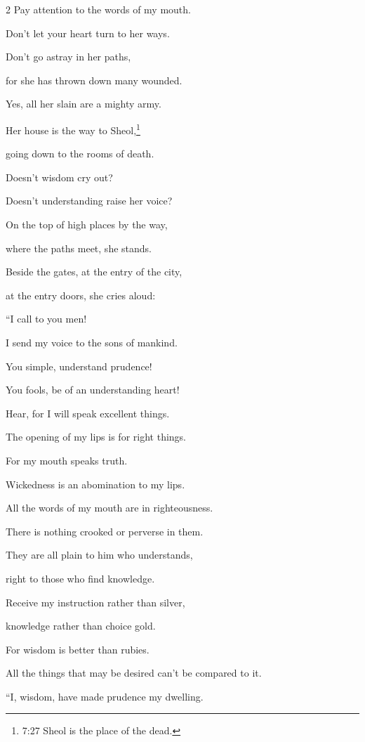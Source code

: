 \begin{multicols}{2}
Pay attention to the words of my mouth.


\myverse{}Don’t let your heart turn to her ways.

Don’t go astray in her paths,


\myverse{}for she has thrown down many wounded.

Yes, all her slain are a mighty army.


\myverse{}Her house is the way to Sheol,\footnote{7:27 Sheol is the place of the dead.
}

going down to the rooms of death.


\mychapter{} \myverse*{}Doesn’t wisdom cry out?

Doesn’t understanding raise her voice?


\myverse{}On the top of high places by the way,

where the paths meet, she stands.


\myverse{}Beside the gates, at the entry of the city,

at the entry doors, she cries aloud:


\myverse{}“I call to you men!

I send my voice to the sons of mankind.


\myverse{}You simple, understand prudence!

You fools, be of an understanding heart!


\myverse{}Hear, for I will speak excellent things.

The opening of my lips is for right things.


\myverse{}For my mouth speaks truth.

Wickedness is an abomination to my lips.


\myverse{}All the words of my mouth are in righteousness.

There is nothing crooked or perverse in them.


\myverse{}They are all plain to him who understands,

right to those who find knowledge.


\myverse{}Receive my instruction rather than silver,

knowledge rather than choice gold.


\myverse{}For wisdom is better than rubies.

All the things that may be desired can’t be compared to it.


\vspace{\baselineskip} 
\myverse{}“I, wisdom, have made prudence my dwelling.


\end{multicols}

